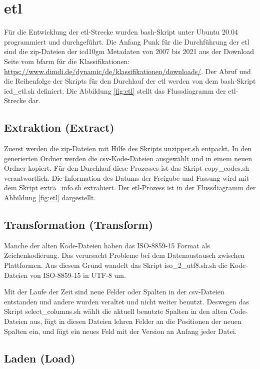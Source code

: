 \section{\acs{etl}} \label{etlpipeline}
Für die Entwicklung der \ac{etl}-Strecke wurden \ac{bash}-Skript unter Ubuntu 20.04 programmiert und durchgeführt. Die Anfang Punk für die Durchführung der \ac{etl} sind die \ac{zip}-Dateien der \ac{icd10gm} Metadaten von 2007 bis 2021 aus der Download Seite vom \ac{bfarm} für die Klassifikationen: \url{https://www.dimdi.de/dynamic/de/klassifikationen/downloads/}. Der Abruf und die Reihenfolge der Skripts für den Durchlauf der \ac{etl} werden von dem \ac{bash}-Skript {\ttfamily icd\_etl.sh} definiert. Die Abbildung \ref{fig:etl} stellt das Flussdiagramm der \ac{etl}-Strecke dar.

\subsection{Extraktion (Extract)}

Zuerst werden die \ac{zip}-Dateien mit Hilfe des Skripts {\ttfamily unzipper.sh} entpackt. In den generierten Ordner werden die \ac{csv}-Kode-Dateien ausgewählt und in einem neuen Ordner kopiert. Für den Durchlauf diese Prozesses ist das Skript {\ttfamily copy\_codes.sh} verantwortlich. Die Information des Datums der Freigabe und Fassung wird mit dem Skript {\ttfamily extra\_info.sh} extrahiert. Der \ac{etl}-Prozess ist in der Flussdiagramm der Abbildung \ref{fig:etl} dargestellt.

\subsection{Transformation (Transform)}

Manche der alten Kode-Dateien haben das ISO-8859-15 Format als Zeichenkodierung. Das verursacht Probleme bei dem Datenaustausch zwischen Plattformen. Aus diesem Grund wandelt das Skript {\ttfamily iso\_2\_utf8.sh.sh} die Kode-Dateien von ISO-8859-15 in UTF-8 um. 

Mit der Laufe der Zeit sind neue Felder oder Spalten in der \ac{csv}-Dateien entstanden und andere wurden veraltet und nicht weiter benutzt. Deswegen das Skript {\ttfamily select\_columns.sh} wählt die aktuell benutzte Spalten in den alten Code-Dateien aus, fügt in diesen Dateien lehren Felder an die Positionen der neuen Spalten ein, und fügt ein neues Feld mit der Version an Anfang jeder Datei.

\subsection{Laden (Load)}

